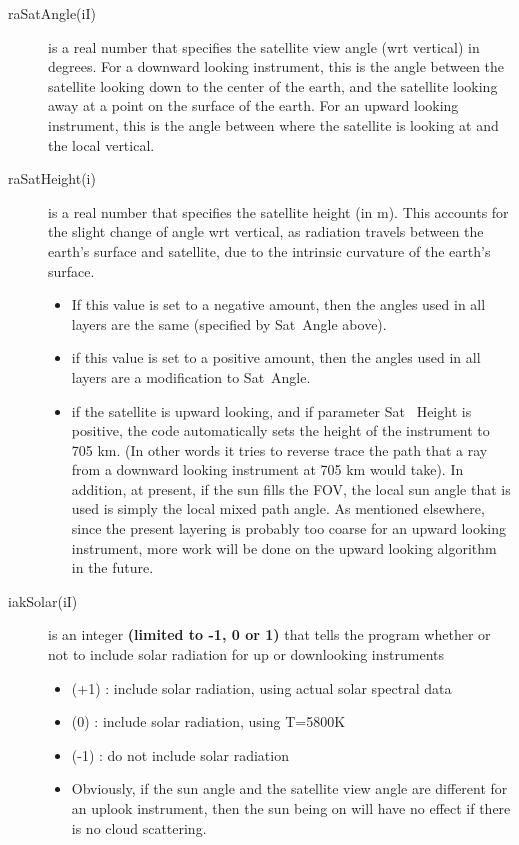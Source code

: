 \documentclass[12pt]{article}
\begin{document}
{\begin{description}
\item[{\sf raSatAngle(iI)}] is a real number that specifies the satellite view 
angle (wrt vertical) in degrees.  For a downward looking instrument, this is 
the angle between the satellite looking down to the center of the earth,
and the satellite looking away at a point on the surface of the
earth.  For an upward looking instrument, this is the angle between where the
satellite is looking at and the local vertical.

\item[{\sf raSatHeight(i)}] is a real number that specifies
the satellite height (in m).  This accounts for the slight change
of angle wrt vertical, as radiation travels between the earth's
surface and satellite, due to the intrinsic curvature of the earth's
surface.

\begin{itemize}
\item If this value is set to a negative amount, then the angles used
  in all layers are the same (specified by {\sf Sat~Angle} above).
\item if this value is set to a positive amount, then the angles used
  in all layers are a modification to {\sf Sat~Angle}.
\item if the satellite is upward looking, and if parameter {\sf Sat
    ~Height} is positive, the code automatically sets the height of
    the instrument to 705 km.  (In other words it tries to reverse trace 
    the path that a ray from a downward looking instrument at 705 km 
    would take). In addition, at present, if the sun fills the FOV, 
    the local sun angle that is used is simply the local mixed path angle.
    As mentioned elsewhere, since the present layering is probably too
    coarse for an upward looking instrument, more work will be done on the
    upward looking algorithm in the future.
\end{itemize}
\end{description}

\begin{description}
\item[{\sf iakSolar(iI)}] is an integer {\bf (limited to -1, 0 or 1)} that 
tells the program whether or not to include solar radiation for up
or downlooking instruments
\begin{itemize} 
\item (+1) : include solar radiation, using actual solar spectral data
\item (0)  : include solar radiation, using T=5800K
\item (-1) : do not include solar radiation
\item Obviously, if the sun angle and the satellite view angle are different 
      for an uplook instrument, then the sun being on will have no effect if
      there is no cloud scattering.
\end{itemize}


\end{description}}
\end{document}

